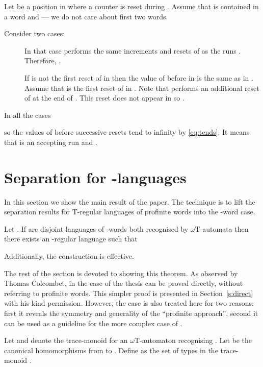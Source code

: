 \documentclass{LMCS}
\newcommand{\wT}{\ensuremath{\omega \mathrm{T}}\xspace}
\newcommand{\fT}{\ensuremath{\mathrm{T}}\xspace}
\begin{document}
\begin{description}
Let  be a position in  where a counter  is reset during . Assume that  is contained in a word  and  --- we do not care about first two words.

Consider two cases:
\begin{description}
\item[] In that case  performs the same increments and resets of  as the runs . Therefore, .
\item[] If  is not the first reset of  in  then the value of  before  in  is the same as in . Assume that  is the first reset of  in . Note that  performs an additional reset of  at the end of . This reset does not appear in  so .
\end{description}

In all the cases

so the values of  before successive resets tend to infinity by \eqref{eq:tends}. It means that  is an accepting run and .
\end{description}



\section{Separation for -languages}\label{s:omega_sep}

In this section we show the main result of the paper. The technique is to lift the separation results for \fT-regular languages of profinite words into the -word case.

\begin{theorem}\label{th:main}
Let . If  are disjoint languages of -words both recognised by \wT-automata then there exists an -regular language  such that


Additionally, the construction is effective.
\end{theorem}

The rest of the section is devoted to showing this theorem. As observed by Thomas Colcombet, in the case of  the thesis can be proved directly, without referring to profinite words. This simpler proof is presented in Section~\ref{s:direct} with his kind permission. However, the  case is also treated here for two reasons: first it reveals the symmetry and generality of the ``profinite approach'', second it can be used as a guideline for the more complex case of .

Let  and  denote the trace-monoid for an \wT-automaton  recognising . Let  be the canonical homomorphisms from  to . Define  as the set of types  in the trace-monoid .
\end{document}
